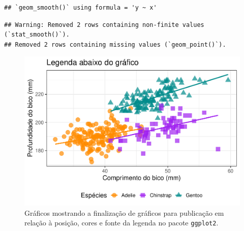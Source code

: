 \documentclass[
]{article}
\begin{document}
\begin{verbatim}
## `geom_smooth()` using formula = 'y ~ x'
\end{verbatim}

\begin{verbatim}
## Warning: Removed 2 rows containing non-finite values (`stat_smooth()`).
## Removed 2 rows containing missing values (`geom_point()`).
\end{verbatim}

\begin{figure}
\centering
\includegraphics{epr_files/figure-latex/fig-plot-final-legenda-2.pdf}
\caption{\label{fig:fig-plot-final-legenda-2}Gráficos mostrando a finalização de gráficos para publicação em relação à posição, cores e fonte da legenda no pacote \texttt{ggplot2}.}
\end{figure}
\end{document}
